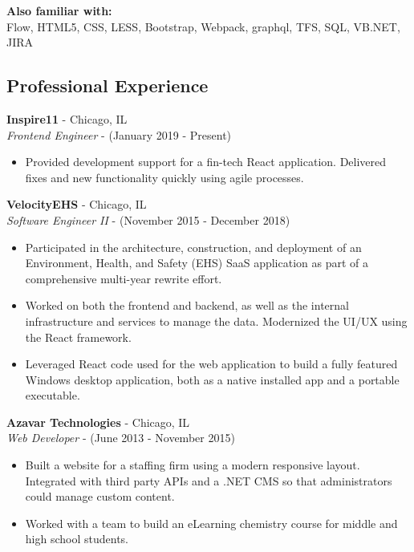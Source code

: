 \documentclass[12pt]{article}
\begin{document}
\begin{paracol}{2}
\noindent \textbf{Also familiar with:}\\
Flow, HTML5, CSS, LESS, Bootstrap, Webpack, graphql, TFS, SQL, VB.NET, JIRA

\switchcolumn 

\subsection*{Professional Experience} 

\textbf{Inspire11} - Chicago, IL \\
\textit{Frontend Engineer} - {\footnotesize{(January 2019 - Present)}} 
\begin{itemize}
    \item {\footnotesize{Provided development support for a fin-tech React application. Delivered fixes and new functionality quickly using agile processes.}}
\end{itemize} 

\noindent \textbf{VelocityEHS} - Chicago, IL \\
\textit{Software Engineer II} - {\footnotesize{(November 2015 - December 2018)}}
\begin{itemize}
    \item {\footnotesize{Participated in the architecture, construction, and deployment of an Environment, Health, and Safety (EHS) SaaS application as part of a comprehensive multi-year rewrite effort.}}
    \item {\footnotesize{Worked on both the frontend and backend, as well as the internal infrastructure and services to manage the data.  Modernized the UI/UX using the React framework.}}
    \item {\footnotesize{Leveraged React code used for the web application to build a fully featured Windows desktop application, both as a native installed app and a portable executable.}}
\end{itemize} 

\noindent \textbf{Azavar Technologies} - Chicago, IL \\
\textit{Web Developer} - {\footnotesize(June 2013 - November 2015)}
\begin{itemize}
    \item {\footnotesize{Built a website for a staffing firm using a modern responsive layout. Integrated with third party APIs and a .NET CMS so that administrators could manage custom content.}}
    \item {\footnotesize{Worked with a team to build an eLearning chemistry course for middle and high school students.}} 
\end{itemize}


\end{paracol}
\end{document}
